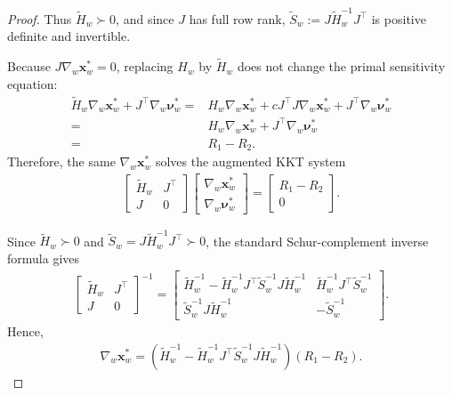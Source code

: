 \documentclass{article}
\newcommand{\bx}{\mathbf{x}}
\begin{document}
\begin{proof}
Thus $\widetilde H_w\succ0$, and since $J$ has full row rank, $\widetilde S_w:=J\widetilde H_w^{-1}J^\top$ is positive definite and invertible.

Because $J\nabla_w\bx_w^*=0$, replacing $H_w$ by $\widetilde H_w$ does not change the primal sensitivity equation:
\begin{align}
\widetilde H_w\nabla_w\bx_w^*+J^\top\nabla_w\boldsymbol{\nu}_w^*
=& H_w\nabla_w\bx_w^*+cJ^\top J\nabla_w\bx_w^*+J^\top\nabla_w\boldsymbol{\nu}_w^* \nonumber\\
=& H_w\nabla_w\bx_w^*+J^\top\nabla_w\boldsymbol{\nu}_w^* \nonumber\\
=& R_1-R_2.
\end{align}
Therefore, the same $\nabla_w\bx_w^*$ solves the augmented KKT system
\begin{align}
\begin{bmatrix}\widetilde H_w&J^\top\\J&0\end{bmatrix}
\begin{bmatrix}\nabla_w\bx_w^*\\\nabla_w\boldsymbol{\nu}_w^*\end{bmatrix}
=
\begin{bmatrix}R_1-R_2\\0\end{bmatrix}.
\label{eq:aug_KKT_condition_on_derive}
\end{align}

Since $\widetilde H_w\succ0$ and $\widetilde S_w=J\widetilde H_w^{-1}J^\top\succ0$, the standard Schur-complement inverse formula gives
\begin{align}
\begin{bmatrix}\widetilde H_w&J^\top\\J&0\end{bmatrix}^{-1}
=
\begin{bmatrix}
\widetilde H_w^{-1}-\widetilde H_w^{-1}J^\top\widetilde S_w^{-1}J\widetilde H_w^{-1}
&
\widetilde H_w^{-1}J^\top\widetilde S_w^{-1}
\\
\widetilde S_w^{-1}J\widetilde H_w^{-1}
&
-\widetilde S_w^{-1}
\end{bmatrix}.
\end{align}
Hence,
\begin{align}
\nabla_w\bx_w^*
=
\left(\widetilde H_w^{-1}-\widetilde H_w^{-1}J^\top\widetilde S_w^{-1}J\widetilde H_w^{-1}\right)(R_1-R_2).
\label{eq:nabla_xw_rl}
\end{align}


\end{proof}
\end{document}
